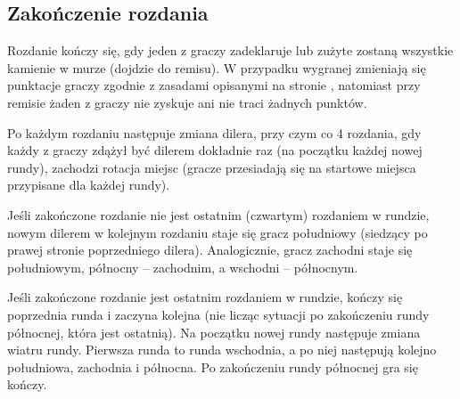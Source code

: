 

\subsection{Zakończenie rozdania}
Rozdanie kończy się, gdy jeden z graczy zadeklaruje  lub zużyte
zostaną wszystkie kamienie w murze (dojdzie do remisu). W przypadku wygranej
zmieniają się punktacje graczy zgodnie z zasadami opisanymi na stronie
\pageref{punktacja}, natomiast przy remisie żaden z graczy nie zyskuje ani nie
traci żadnych punktów. 

Po każdym rozdaniu następuje zmiana dilera, przy czym co 4 rozdania, gdy każdy z
graczy zdążył być dilerem dokładnie raz (na początku każdej nowej rundy),
zachodzi rotacja miejsc (gracze przesiadają się na startowe miejsca przypisane
dla każdej rundy).

Jeśli zakończone rozdanie nie jest ostatnim (czwartym) rozdaniem w rundzie,
nowym dilerem w kolejnym rozdaniu staje się gracz południowy (siedzący po
prawej stronie poprzedniego dilera). Analogicznie, gracz zachodni staje się
południowym, północny -- zachodnim, a wschodni -- północnym.

Jeśli zakończone rozdanie jest ostatnim rozdaniem w rundzie, kończy się
poprzednia runda i zaczyna kolejna (nie licząc sytuacji po zakończeniu rundy
północnej, która jest ostatnią). Na początku nowej rundy następuje zmiana wiatru
rundy. Pierwsza runda to runda wschodnia, a po niej następują kolejno
południowa, zachodnia i północna. Po zakończeniu rundy północnej gra się kończy.

